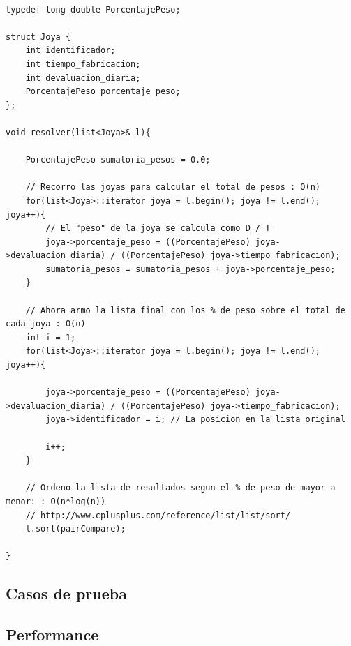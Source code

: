 \begin{lstlisting}
               
typedef long double PorcentajePeso;

struct Joya {
	int identificador;
	int tiempo_fabricacion;
	int devaluacion_diaria;
	PorcentajePeso porcentaje_peso;
};

void resolver(list<Joya>& l){
	
	PorcentajePeso sumatoria_pesos = 0.0;
	
	// Recorro las joyas para calcular el total de pesos : O(n)
	for(list<Joya>::iterator joya = l.begin(); joya != l.end(); joya++){
		// El "peso" de la joya se calcula como D / T
		joya->porcentaje_peso = ((PorcentajePeso) joya->devaluacion_diaria) / ((PorcentajePeso) joya->tiempo_fabricacion);
		sumatoria_pesos = sumatoria_pesos + joya->porcentaje_peso;
	}
	
	// Ahora armo la lista final con los % de peso sobre el total de cada joya : O(n)
	int i = 1;
	for(list<Joya>::iterator joya = l.begin(); joya != l.end(); joya++){
		
		joya->porcentaje_peso = ((PorcentajePeso) joya->devaluacion_diaria) / ((PorcentajePeso) joya->tiempo_fabricacion);
		joya->identificador = i; // La posicion en la lista original
		
		i++;
	}
	
	// Ordeno la lista de resultados segun el % de peso de mayor a menor: : O(n*log(n)) 
	// http://www.cplusplus.com/reference/list/list/sort/
	l.sort(pairCompare);

}
\end{lstlisting}

\subsection{Casos de prueba}

\subsection{Performance}
